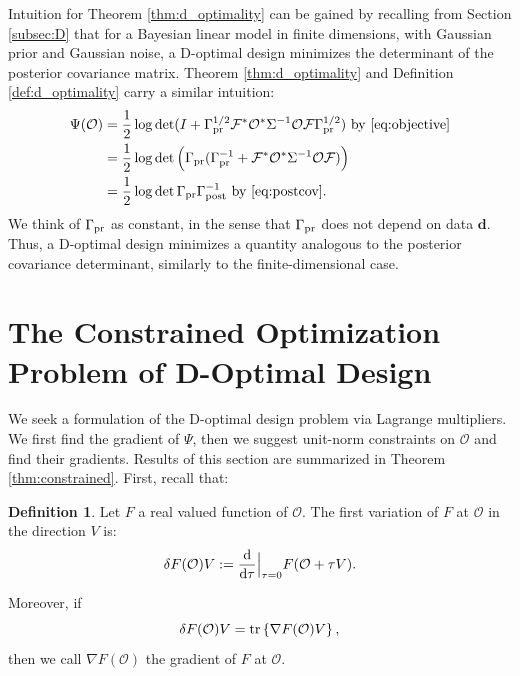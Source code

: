 \documentclass[ba]{imsart}
\newcommand{\der}{\text{\textup{d}}}
\newcommand{\obs}{\mathcal{O}}
\newcommand{\fwd}{\mathcal{F}}
\newcommand{\tar}{\Psi}
\newcommand{\data}{\mathbf{d}}
\newcommand{\tr}[1]{\textup{tr}\left \{#1 \right \} }
\theoremstyle{plain}
\theoremstyle{definition}
\newtheorem{definition}[theorem]{Definition}
\theoremstyle{remark}
\begin{document}
Intuition for Theorem \ref{thm:d_optimality} can be gained by
recalling from Section \ref{subsec:D} that for a Bayesian linear model
in finite dimensions, with Gaussian prior and Gaussian noise, a
D-optimal design minimizes the determinant of the posterior covariance
matrix. Theorem
\ref{thm:d_optimality} and Definition \ref{def:d_optimality} carry a
similar intuition:
\begin{align*}
  \begin{split}
    \tar(\obs) &= \frac12 \log \det ( I + \prcov^{1/2}  \fwd ^* \obs^* \Sigma^{-1} \obs \fwd \prcov^{1/2}) \text{ by \eqref{eq:objective}}\\
    &= \frac12 \log \det \Big( \prcov ( \prcov^{-1} + \fwd ^* \obs^* \Sigma^{-1} \obs \fwd) \Big )\\
    &= \frac12 \log \det \prcov \postcov^{-1} \text{ by \eqref{eq:postcov}}.
\end{split}
\end{align*}
We think of \(\Gamma_{\textup{pr}}\) as constant, in the sense that $\Gamma_{\textup{pr}}$ does
not depend on data $\data$. Thus, a D-optimal design minimizes a
quantity analogous to the posterior covariance determinant, similarly
to the finite-dimensional case.











 \section{The Constrained Optimization Problem of D-Optimal Design}\label{section:D_and_grad}
We seek a formulation of the D-optimal design problem via Lagrange
multipliers. We first find the gradient of $\tar$, then we suggest
unit-norm constraints on $\obs$ and find their gradients. Results of
this section are summarized in Theorem \ref{thm:constrained}. First,
recall that:
\begin{definition}\label{def:var}
  Let $F$ a real valued function of $\obs$. The first variation of $F$
  at $\obs$ in the direction $V$ is:
  \begin{equation*}
    \delta F(\obs) V := \frac{\der}{\der \tau}\Big |_{\tau=0}  F( \obs + \tau V).
  \end{equation*}

  Moreover, if
  \begin{equation*}
    \delta F(\obs) V = \tr{\nabla F(\obs) V},
  \end{equation*}
  then we call $\nabla F(\obs)$ the gradient of $F$ at $\obs$. 
\end{definition}
\end{document}
